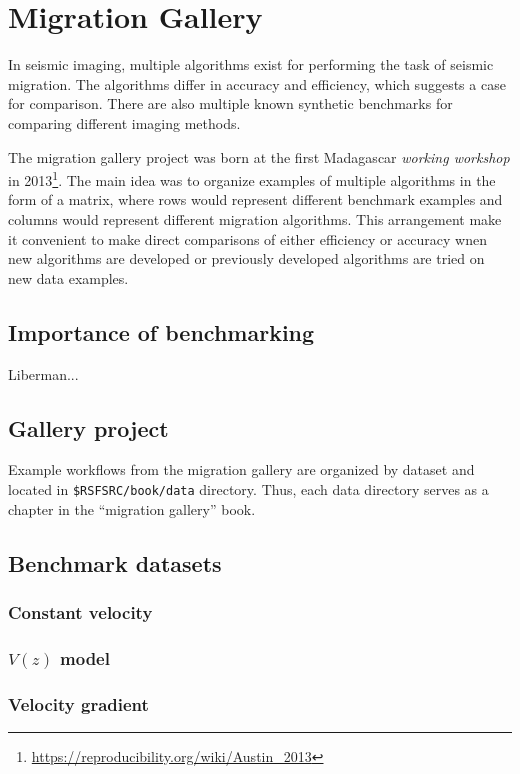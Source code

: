 \chapter{Migration Gallery}

In seismic imaging, multiple algorithms exist for performing the task
of seismic migration. The algorithms differ in accuracy and
efficiency, which suggests a case for comparison. There are also
multiple known synthetic benchmarks for comparing different imaging methods.

The migration gallery project was born at the first Madagascar
\emph{working workshop} in
2013\footnote{\url{https://reproducibility.org/wiki/Austin_2013}}. The
main idea was to organize examples of multiple algorithms in the form
of a matrix, where rows would represent different benchmark examples
and columns would represent different migration algorithms. This
arrangement make it convenient to make direct comparisons of either
efficiency or accuracy wnen new algorithms are developed or previously
developed algorithms are tried on new data examples.

\section{Importance of benchmarking}

Liberman...

\section{Gallery project}

Example workflows from the migration gallery are organized by dataset
and located in \texttt{\$RSFSRC/book/data} directory. Thus, each data
directory serves as a chapter in the ``migration gallery'' book.

\section{Benchmark datasets}

\subsection{Constant velocity}

\subsection{$V(z)$ model}

\subsection{Velocity gradient}


